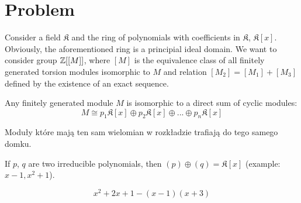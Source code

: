 \section{Problem}

Consider a field $\mathfrak{K}$ and the ring of polynomials with coefficients in $\mathfrak{K}$, $\mathfrak{K}[x]$. Obviously, the aforementioned ring is a principial ideal domain. We want to consider group $\operatorname{\mathbb{Z}}[[M]]$, where $[M]$ is the equivalence class of all finitely generated torsion modules isomorphic to $M$ and relation $[M_2]=[M_1]+[M_3]$ defined by the existence of an exact sequence.

Any finitely generated module $M$ is isomorphic to a direct sum of cyclic modules:
$$M\cong p_1\mathfrak{K}[x]\oplus p_2\mathfrak{K}[x]\oplus...\oplus p_n\mathfrak{K}[x]$$

Moduły które mają ten sam wielomian w rozkładzie trafiają do tego samego domku.

{\color{green} If $p$, $q$ are two irreducible polynomials, then $(p)\oplus  (q)=\mathfrak{K}[x]$ (example: $x-1, x^2+1$).}


$$x^2+2x+1-(x-1)(x+3)$$
